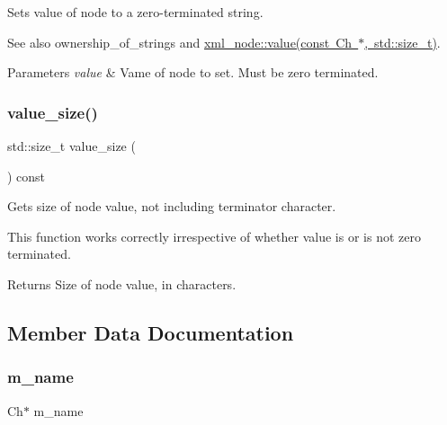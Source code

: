 Sets value of node to a zero-\/terminated string. 

See also ownership\+\_\+of\+\_\+strings and \mbox{\hyperlink{classrapidxml_1_1xml__base_ad9640aa3f5374673cb72a5289b6c91eb}{xml\+\_\+node\+::value(const Ch $\ast$, std\+::size\+\_\+t)}}. 
\begin{DoxyParams}{Parameters}
{\em value} & Vame of node to set. Must be zero terminated. \\
\hline
\end{DoxyParams}
\mbox{\label{classrapidxml_1_1xml__base_aa6981b3244607ea4ae7634f74f25361b}} 
\subsubsection{\texorpdfstring{value\+\_\+size()}{value\_size()}}
{\footnotesize\ttfamily std\+::size\+\_\+t value\+\_\+size (\begin{DoxyParamCaption}{ }\end{DoxyParamCaption}) const\hspace{0.3cm}{\ttfamily [inline]}}



Gets size of node value, not including terminator character. 

This function works correctly irrespective of whether value is or is not zero terminated. \begin{DoxyReturn}{Returns}
Size of node value, in characters. 
\end{DoxyReturn}


\subsection{Member Data Documentation}
\mbox{\label{classrapidxml_1_1xml__base_a23053aafada985ece680d52694c63cdc}} 
\subsubsection{\texorpdfstring{m\+\_\+name}{m\_name}}
{\footnotesize\ttfamily Ch$\ast$ m\+\_\+name\hspace{0.3cm}{\ttfamily [protected]}}

